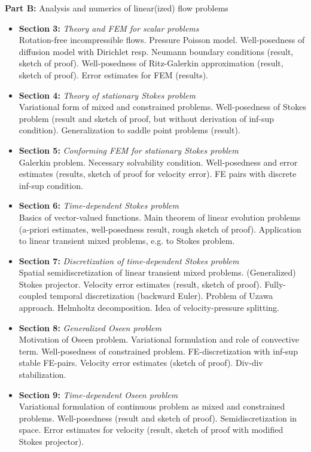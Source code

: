 \documentclass[a4paper,10pt]{article}
\begin{document}
\textbf{Part B:} Analysis and numerics of linear(ized) flow problems
\begin{itemize}
\item \textbf{Section 3:} \textit{Theory and FEM for scalar problems}\\
Rotation-free incompressible flows. Pressure Poisson model. Well-posedness of diffusion model
with Dirichlet resp. Neumann boundary conditions (result, sketch of proof). Well-posedness of
Ritz-Galerkin approximation (result, sketch of proof). Error estimates for FEM (results).
\item \textbf{Section 4:} \textit{Theory of stationary Stokes problem}\\
Variational form of mixed and constrained problems. Well-posedness of Stokes problem (result
and sketch of proof, but without derivation of inf-sup condition). Generalization to saddle point
problems (result).
\item \textbf{Section 5:} \textit{Conforming FEM for stationary Stokes problem}\\
Galerkin problem. Necessary solvability condition. Well-posedness and error estimates (results,
sketch of proof for velocity error). FE pairs with discrete inf-sup condition.
\item \textbf{Section 6:} \textit{Time-dependent Stokes problem}\\
Basics of vector-valued functions. Main theorem of linear evolution problems (a-priori estimates,
well-posedness result, rough sketch of proof). Application to linear transient mixed problems, e.g.
to Stokes problem.
\item \textbf{Section 7:} \textit{Discretization of time-dependent Stokes problem}\\
Spatial semidiscretization of linear transient mixed problems. (Generalized) Stokes projector. 
Velocity error estimates (result, sketch of proof). Fully-coupled temporal discretization (backward
Euler). Problem of Uzawa approach. Helmholtz decomposition. Idea of velocity-pressure splitting.
\item \textbf{Section 8:} \textit{Generalized Oseen problem}\\
Motivation of Oseen problem. Variational formulation and role of convective term. Well-posedness
of constrained problem. FE-discretization with inf-sup stable FE-pairs. Velocity error estimates
(sketch of proof). Div-div stabilization.
\item \textbf{Section 9:} \textit{Time-dependent Oseen problem}\\
Variational formulation of continuous problem as mixed and constrained problems. Well-posedness
(result and sketch of proof). Semidiscretization in space. Error estimates for velocity (result, sketch
of proof with modified Stokes projector).
\end{itemize}
\end{document}

